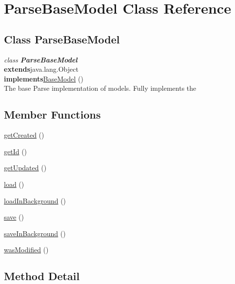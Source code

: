\hypertarget{class_ParseBaseModel.Android}{\section{ParseBaseModel Class Reference}
\label{class_ParseBaseModel.Android}
}

\subsection*{Class ParseBaseModel}

\textit{class \textbf{ParseBaseModel}}\\
\tab \textbf{extends}java.lang.Object\\
\tab \textbf{implements}\hyperlink{class_BaseModel.Android}{BaseModel} ()\\


The base Parse implementation of models. Fully implements the\\


\subsection*{Member Functions}
\begin{DoxyCompactItemize}
\item 
\hyperlink{class_ParseBaseModel.Android.getCreated}{getCreated} ()
\item 
\hyperlink{class_ParseBaseModel.Android.getId}{getId} ()
\item 
\hyperlink{class_ParseBaseModel.Android.getUpdated}{getUpdated} ()
\item 
\hyperlink{class_ParseBaseModel.Android.load}{load} ()
\item 
\hyperlink{class_ParseBaseModel.Android.loadInBackground}{loadInBackground} ()
\item 
\hyperlink{class_ParseBaseModel.Android.save}{save} ()
\item 
\hyperlink{class_ParseBaseModel.Android.saveInBackground}{saveInBackground} ()
\item 
\hyperlink{class_ParseBaseModel.Android.wasModified}{wasModified} ()
\end{DoxyCompactItemize}




\subsection{Method Detail}

